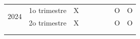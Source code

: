 \begin{table}[!h]
\begin{tabular}{ccccccccc}
\multicolumn{1}{|c|}{\multirow{2}{*}{2024}} & \multicolumn{1}{c|}{1o trimestre} & \multicolumn{1}{c|}{X} & \multicolumn{1}{c|}{} & \multicolumn{1}{c|}{} & \multicolumn{1}{c|}{} & \multicolumn{1}{c|}{} & \multicolumn{1}{c|}{O} & \multicolumn{1}{c|}{O} \\ \cline{2-9} 
\multicolumn{1}{|c|}{} & \multicolumn{1}{c|}{2o trimestre} & \multicolumn{1}{c|}{X} & \multicolumn{1}{c|}{} & \multicolumn{1}{c|}{} & \multicolumn{1}{c|}{} & \multicolumn{1}{c|}{} & \multicolumn{1}{c|}{O} & \multicolumn{1}{c|}{O} \\ \hline
\multicolumn{1}{l}{} & \multicolumn{1}{l}{} & \multicolumn{1}{l}{} & \multicolumn{1}{l}{} & \multicolumn{1}{l}{} & \multicolumn{1}{l}{} & \multicolumn{1}{l}{} & \multicolumn{1}{l}{} & \multicolumn{1}{l}{} \\
\multicolumn{1}{l}{} & \multicolumn{1}{l}{} & \multicolumn{1}{l}{} & \multicolumn{1}{l}{} & \multicolumn{1}{l}{} & \multicolumn{1}{l}{} & \multicolumn{1}{l}{} & \multicolumn{1}{l}{} & \multicolumn{1}{l}{}
\end{tabular}
\end{table}

